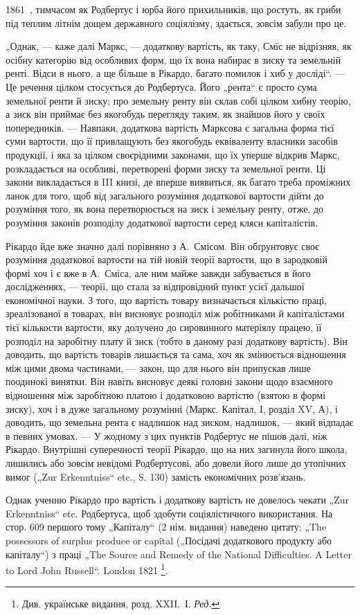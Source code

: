 \parcont{}  %
1861~, тимчасом як Родбертус і юрба його прихильників, що ростуть,
як гриби під теплим літнім дощем державного соціялізму, здається, зовсім
забули про це.

„Однак, — каже далі Маркс, — додаткову вартість, як таку, Сміс не
відрізняв, як осібну категорію від особливих форм, що їх вона набирає
в зиску та земельній ренті. Відси в нього, а ще більше в Рікардо, багато
помилок і хиб у досліді“. — Це речення цілком стосується до Родбертуса.
Його „рента“ є просто сума земельної ренти й зиску; про земельну
ренту він склав собі цілком хибну теорію, а зиск він приймає без якогобудь
перегляду таким, як знайшов його у своїх попередників. — Навпаки,
додаткова вартість Марксова є загальна форма тієї суми вартости, що
її привлащують без якогобудь еквіваленту власники засобів продукції,
і яка за цілком своєрідними законами, що їх уперше відкрив Маркс,
розкладається на особливі, перетворені форми зиску та земельної ренти.
Ці закони викладається в III книзі, де вперше виявиться, як багато треба
проміжних ланок для того, щоб від загального розуміння додаткової
вартости дійти до розуміння того, як вона перетворюється на зиск і
земельну ренту, отже, до розуміння законів розподілу додаткової вартости
серед кляси капіталістів.

Рікардо йде вже значно далі порівняно з А.~Смісом. Він обґрунтовує
своє розуміння додаткової вартости на тій новій теорії вартости, що в
зародковій формі хоч і є вже в А.~Сміса, але ним майже завжди забувається
в його дослідженнях, — теорії, що стала за відпровідний пункт
усієї дальшої економічної науки. З того, що вартість товару визначається
кількістю праці, зреалізованої в товарах, він висновує розподіл між
робітниками й капіталістами тієї кількости вартости, яку долучено до
сировинного матеріялу працею, її розподіл на заробітну плату й зиск
(тобто в даному разі додаткову вартість). Він доводить, що вартість
товарів лишається та сама, хоч як змінюється відношення між цими двома
частинами, — закон, що для нього він припускав лише поодинокі винятки.
Він навіть висновує деякі головні закони щодо взаємного відношення між
заробітною платою і додатковою вартістю (взятою в формі зиску), хоч і в
дуже загальному розумінні (Маркс. Капітал, І, розділ XV, А), і доводить, що
земельна рента є надлишок над зиском, надлишок, — який відпадає в певних
умовах. — У жодному з цих пунктів Родбертус не пішов далі, ніж Рікардо.
Внутрішні суперечності теорії Рікардо, що на них загинула його школа, лишились
або зовсім невідомі Родбертусові, або довели його лише до утопічних
вимог („Zur Erkenntniss“ etc., S. 130) замість економічних розв’язань.

Однак ученню Рікардо про вартість і додаткову вартість не довелось
чекати „Zur Erkenntniss“ etc. Родбертуса, щоб здобути соціялістичного
використання. На стор. 609 першого тому „Капіталу“ (2 нім. видання)
наведено цитату: „The possessors of surplus produce or capital („Посідачі
додаткового продукту або капіталу“) з праці „The Source and Remedy of
the National Difficulties. A Letter to Lord John Russell“. London 1821 \footnote*{
Див. українське видання, розд. XXII.~І. \emph{Ред.}
}.
\parbreak{}  %
